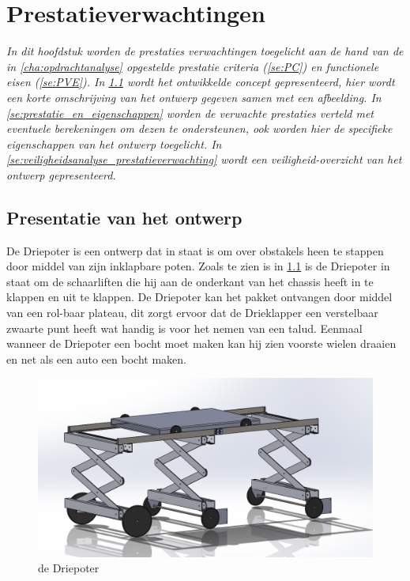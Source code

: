
\chapter{Prestatieverwachtingen}
\label{Prestatie_verwachtingen}
\textit{In dit hoofdstuk worden de prestaties verwachtingen toegelicht aan de hand van de in \cref{cha:opdrachtanalyse} opgestelde prestatie criteria (\cref{se:PC}) en functionele eisen (\cref{se:PVE}). In \cref{se:presentatie_ontwerp} wordt het ontwikkelde concept gepresenteerd, hier wordt een korte omschrijving van het ontwerp gegeven samen met een afbeelding. In \cref{se:prestatie_en_eigenschappen} worden de verwachte prestaties verteld met eventuele berekeningen om dezen te ondersteunen, ook worden hier de specifieke eigenschappen van het ontwerp toegelicht. In \cref{se:veiligheidsanalyse_prestatieverwachting} wordt een veiligheid-overzicht van het ontwerp gepresenteerd.}

\section{Presentatie van het ontwerp}
\label{se:presentatie_ontwerp}

De Driepoter is een ontwerp dat in staat is om over obstakels heen te stappen door middel van zijn inklapbare poten. Zoals te zien is in \cref{fig:De_driepoter_Prestatie_analyse} is de Driepoter in staat om de schaarliften die hij aan de onderkant van het chassis heeft in te klappen en uit te klappen. De Driepoter kan het pakket ontvangen door middel van een rol-baar plateau, dit zorgt ervoor dat de Drieklapper een verstelbaar zwaarte punt heeft wat handig is voor het nemen van een talud. Eenmaal wanneer de Driepoter een bocht moet maken kan hij zien voorste wielen draaien en net als een auto een bocht maken.\\

\vspace{\baselineskip}
\begin{figure}[H]
    \includegraphics[width = 120mm]{04_gekozenconcept/eindconcept.png}
    \caption{de Driepoter}
    \label{fig:De_driepoter_Prestatie_analyse}
\end{figure}


